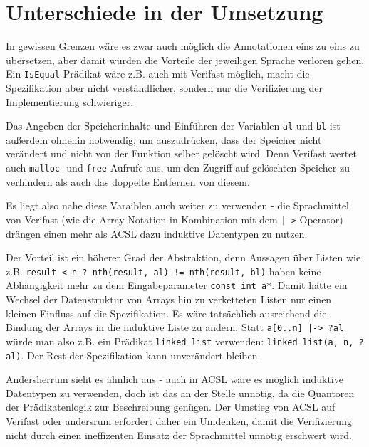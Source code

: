 \section{Unterschiede in der Umsetzung}

In gewissen Grenzen wäre es zwar auch möglich die Annotationen eins zu eins zu übersetzen, aber damit
würden die Vorteile der jeweiligen Sprache verloren gehen. Ein \lstinline{IsEqual}-Prädikat wäre z.B.
auch mit Verifast möglich, macht die Spezifikation aber nicht verständlicher, sondern nur die Verifizierung
der Implementierung schwieriger. 

Das Angeben der Speicherinhalte und Einführen der Variablen  \lstinline{al} und \lstinline{bl} ist außerdem
ohnehin notwendig, um auszudrücken, dass der Speicher nicht verändert und nicht von der Funktion selber
gelöscht wird. Denn Verifast wertet auch \lstinline{malloc}- und \lstinline{free}-Aufrufe aus, um 
den Zugriff auf gelöschten Speicher zu verhindern als auch das doppelte Entfernen von diesem.

Es liegt also nahe diese Varaiblen auch weiter zu verwenden - die Sprachmittel von Verifast (wie die Array-Notation in Kombination mit dem
\lstinline{|->} Operator) drängen einen mehr als ACSL dazu induktive Datentypen zu nutzen.

Der Vorteil ist ein höherer Grad der Abstraktion, denn Aussagen über Listen wie z.B.
\lstinline{result < n ? nth(result, al) != nth(result, bl)} haben keine Abhängigkeit mehr zu
dem Eingabeparameter \lstinline{const int a*}. Damit hätte ein Wechsel der Datenstruktur von Arrays
hin zu verketteten Listen nur einen kleinen Einfluss auf die Spezifikation. Es wäre tatsächlich ausreichend
die Bindung der Arrays in die induktive Liste zu ändern. Statt \lstinline{a[0..n] |-> ?al} würde man also
z.B. ein Prädikat \lstinline{linked_list} verwenden: \lstinline{linked_list(a, n, ?al)}. Der Rest der 
Spezifikation kann unverändert bleiben.


\newline
\newline
Andersherrum sieht es ähnlich aus - auch in ACSL wäre es möglich induktive Datentypen zu verwenden, doch
ist das an der Stelle unnötig, da die Quantoren der Prädikatenlogik zur Beschreibung genügen. 
Der Umstieg von ACSL auf Verifast oder andersrum erfordert daher ein Umdenken, damit die Verifizierung 
nicht durch einen ineffizenten Einsatz der Sprachmittel unnötig erschwert wird.


